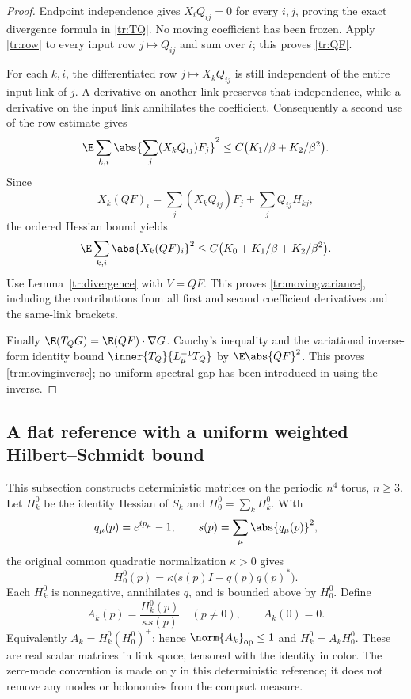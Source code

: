 \begin{proof}
Endpoint independence gives \(X_iQ_{ij}=0\) for every \(i,j\), proving the
exact divergence formula in \eqref{tr:TQ}. No moving coefficient has been
frozen. Apply \eqref{tr:row} to every input row \(j\mapsto Q_{ij}\) and sum
over \(i\); this proves \eqref{tr:QF}.

For each \(k,i\), the differentiated row \(j\mapsto X_kQ_{ij}\) is still
independent of the entire input link of \(j\). A derivative on another link
preserves that independence, while a derivative on the input link annihilates
the coefficient. Consequently a second use of the row estimate gives
\[
 \E\sum_{k,i}\abs{\sum_j(X_kQ_{ij})F_j}^2
 \le C\bigl(K_1/\beta+K_2/\beta^2\bigr).
\]
Since
\[
 X_k(QF)_i=\sum_j(X_kQ_{ij})F_j+\sum_jQ_{ij}H_{kj},
\]
the ordered Hessian bound yields
\begin{equation}
 \E\sum_{k,i}\abs{X_k(QF)_i}^2
 \le C\bigl(K_0+K_1/\beta+K_2/\beta^2\bigr).
 \label{tr:gradV}
\end{equation}
Use Lemma~\ref{tr:divergence} with \(V=QF\). This proves
\eqref{tr:movingvariance}, including the contributions from all first and
second coefficient derivatives and the same-link brackets.

Finally \(\E(T_QG)=\E(QF)\cdot\nabla G\). Cauchy's inequality and the
variational inverse-form identity bound \(\inner{T_Q}{L_\mu^{-1}T_Q}\)
by \(\E\abs{QF}^2\). This proves \eqref{tr:movinginverse}; no uniform
spectral gap has been introduced in using the inverse.
\end{proof}

\subsection{A flat reference with a uniform weighted Hilbert--Schmidt bound}

This subsection constructs deterministic matrices on the periodic \(n^4\)
torus, \(n\ge3\). Let \(H_k^0\) be the identity Hessian of \(S_k\) and
\(H_0^0=\sum_kH_k^0\). With
\[
 q_\mu(p)=e^{ip_\mu}-1,\qquad s(p)=\sum_\mu\abs{q_\mu(p)}^2,
\]
the original common quadratic normalization \(\kappa>0\) gives
\[
 H_0^0(p)=\kappa\bigl(s(p)I-q(p)q(p)^*\bigr).
\]
Each \(H_k^0\) is nonnegative, annihilates \(q\), and is bounded above by
\(H_0^0\). Define
\begin{equation}
 A_k(p)=\frac{H_k^0(p)}{\kappa s(p)}\quad(p\ne0),\qquad A_k(0)=0.
 \label{tr:Ak}
\end{equation}
Equivalently \(A_k=H_k^0(H_0^0)^+\); hence
\(\norm{A_k}_{\rm op}\le1\) and \(H_k^0=A_kH_0^0\).
These are real scalar matrices in link space, tensored with the identity in
color. The zero-mode convention is made only in this deterministic reference;
it does not remove any modes or holonomies from the compact measure.


